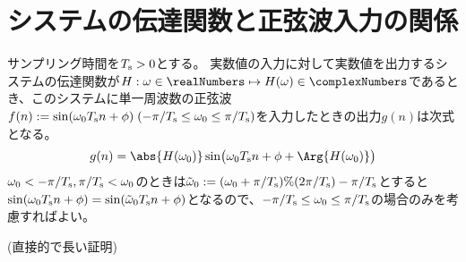     \section{システムの伝達関数と正弦波入力の関係}
        \newcommand{\Ts}{\Tsamp}
        \begin{shadebox}
            サンプリング時間を$\Ts>0$とする。
            実数値の入力に対して実数値を出力するシステムの伝達関数が$H:\omega\in\realNumbers\mapsto H(\omega)\in\complexNumbers$であるとき、このシステムに単一周波数の正弦波$f(n) := \sin(\omega_0 \Ts n + \phi)\;(-\pi/\Ts\leq\omega_0\leq\pi/\Ts)$を入力したときの出力$g(n)$は次式となる。
            \[ g(n) = \abs{H(\omega_0)}\sin\bigl(\omega_0 \Ts n + \phi + \Arg{H(\omega_0)}\bigr) \]
            $\omega_0<-\pi/\Ts, \pi/\Ts<\omega_0$のときは$\tilde{\omega}_0 := (\omega_0+\pi/\Ts)\%(2\pi/\Ts)-\pi/\Ts$とすると$\sin(\omega_0 \Ts n + \phi) = \sin(\tilde{\omega}_0 \Ts n + \phi)$となるので、$-\pi/\Ts\leq\omega_0\leq\pi/\Ts$の場合のみを考慮すればよい。
        \end{shadebox}
        (直接的で長い証明)
